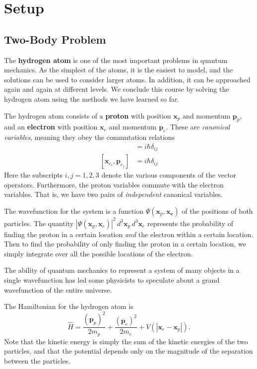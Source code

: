 \section{Setup}
\subsection{Two-Body Problem}\label{two_body_problem}

The \textbf{hydrogen atom} is one of the most important problems in quantum mechanics. As the simplest of the atoms, it is the easiest to model, and the solutions can be used to consider larger atoms. In addition, it can be approached again and again at different levels. We conclude this course by solving the hydrogen atom using the methods we have learned so far.

The hydrogen atom consists of a \textbf{proton} with position $\mathbf{x}_p$ and momentum $\mathbf{p}_p$, and an \textbf{electron} with position $\mathbf{x}_e$ and momentum $\mathbf{p}_e$. These are \textit{canonical variables}, meaning they obey the commutation relations \begin{align*}[\mathbf{x}_{p_i},\mathbf{p}_{p_j}]&=i\hbar\delta_{ij}\\ [\mathbf{x}_{e_i},\mathbf{p}_{e_j}]&=i\hbar\delta_{ij}\end{align*}Here the subscripts $i,j=1,2,3$ denote the various components of the vector operators. Furthermore, the proton variables commute with the electron variables. That is, we have two pairs of \textit{independent} canonical variables.

The wavefunction for the system is a function $\Psi(\mathbf{x}_p,\mathbf{x_e})$ of the positions of both particles. The quantity $|\Psi(\mathbf{x}_p,\mathbf{x}_e)|^2\,d^3\mathbf{x}_p\,d^3\mathbf{x}_e$ represents the probability of finding the proton in a certain location \textit{and} the electron within a certain location. Then to find the probability of only finding the proton in a certain location, we simply integrate over all the possible locations of the electron.

\begin{framedrmk*}
    The ability of quantum mechanics to represent a system of many objects in a single wavefunction has led some physicists to speculate about a grand wavefunction of the entire universe.
\end{framedrmk*}

The Hamiltonian for the hydrogen atom is $$\hat{H}=\frac{(\mathbf{p}_p)^2}{2m_p}+\frac{(\mathbf{p}_e)^2}{2m_e}+V(|\mathbf{x}_e-\mathbf{x}_p|).$$Note that the kinetic energy is simply the sum of the kinetic energies of the two particles, and that the potential depends only on the magnitude of the separation between the particles.

